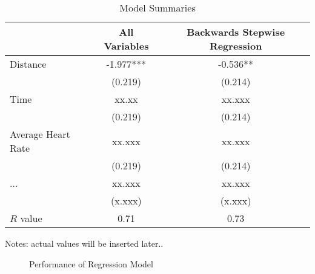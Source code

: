 \documentclass[12pt,english]{article}
\begin{document}
\begin{table}[ht]
\caption{Model Summaries}
\label{tab:estimates} 
\centering
\begin{threeparttable}
\begin{tabular}{lcc}
\toprule
                 & All Variables    & Backwards Stepwise Regression \\
\midrule
Distance             & -1.977***       & -0.536**    \\
                     & (0.219)         & (0.214)     \\
Time                 & xx.xx           & xx.xxx     \\
                     & (0.219)         & (0.214)     \\
Average Heart Rate   & xx.xxx         & xx.xxx   \\
                     & (0.219)         & (0.214)     \\
...                  &  xx.xxx        &  xx.xxx\\
                     & (x.xxx)         & (x.xxx)     \\
\midrule
$R$ value                  & 0.71          & 0.73      \\
\bottomrule
\end{tabular}
\footnotesize Notes: actual values will be inserted later..
\end{threeparttable}
\end{table}
\begin{figure}[ht]
\centering
\bigskip{}
\caption{Performance of Regression Model}
\label{fig:fig1}
\end{figure}
\end{document}

